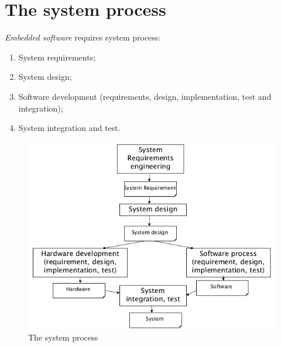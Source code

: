 \section{The system process}
\emph{Embedded software} requires system process:

\begin{enumerate}
\item System requirements;
\item System design;
\item Software development (requirements, design, implementation, test and integration);
\item System integration and test.
\end{enumerate}

\begin{figure}[hbtp]
\centering
\includegraphics[scale=0.4]{images/system_process.jpg}
\caption{The system process}
\end{figure}